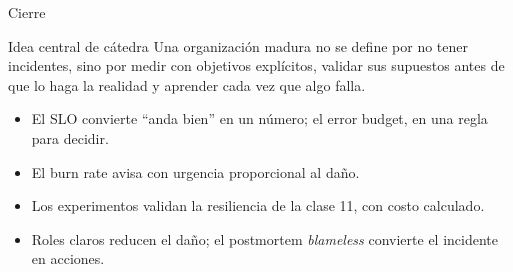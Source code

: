 \documentclass[institutional,screen,none]{ua-engineering-v6-beamer}
\begin{document}
\begin{frame}{Cierre}
\begin{block}{Idea central de cátedra}
Una organización madura no se define por no tener incidentes, sino por medir con objetivos explícitos, validar sus supuestos antes de que lo haga la realidad y aprender cada vez que algo falla.
\end{block}

\pause

\begin{itemize}\small
\item El SLO convierte ``anda bien'' en un número; el error budget, en una regla para decidir.
\item El burn rate avisa con urgencia proporcional al daño.
\item Los experimentos validan la resiliencia de la clase 11, con costo calculado.
\item Roles claros reducen el daño; el postmortem \emph{blameless} convierte el incidente en acciones.
\end{itemize}
\end{frame}
\end{document}
